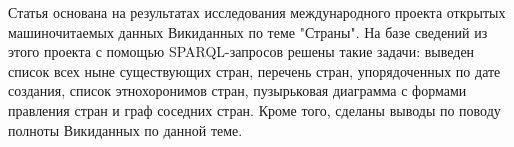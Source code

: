 Статья основана на результатах исследования международного проекта открытых машиночитаемых данных Викиданных по теме "Страны". На базе сведений из этого проекта с помощью SPARQL-запросов решены такие задачи: выведен список всех ныне существующих стран, перечень стран, упорядоченных по дате создания, список этнохоронимов стран, пузырьковая диаграмма с формами правления стран и граф соседних стран. Кроме того, сделаны выводы по поводу полноты Викиданных по данной теме.
